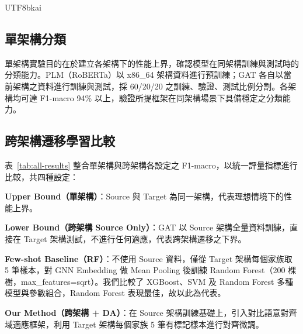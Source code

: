 \documentclass[10pt, a4paper, twocolumn]{article}
\begin{document}
\begin{CJK*}{UTF8}{bkai}
\subsection{單架構分類}

單架構實驗目的在於建立各架構下的性能上界，確認模型在同架構訓練與測試時的分類能力。PLM（RoBERTa）以 x86\_64 架構資料進行預訓練；GAT 各自以當前架構之資料進行訓練與測試，採 60/20/20 之訓練、驗證、測試比例分割。各架構均可達 F1-macro 94\% 以上，驗證所提框架在同架構場景下具備穩定之分類能力。

\subsection{跨架構遷移學習比較}

表~\ref{tab:all-results} 整合單架構與跨架構各設定之 F1-macro，以統一評量指標進行比較，共四種設定：

\textbf{Upper Bound（單架構）}：Source 與 Target 為同一架構，代表理想情境下的性能上界。

\textbf{Lower Bound（跨架構 Source Only）}：GAT 以 Source 架構全量資料訓練，直接在 Target 架構測試，不進行任何適應，代表跨架構遷移之下界。

\textbf{Few-shot Baseline（RF）}：不使用 Source 資料，僅從 Target 架構每個家族取 5 筆樣本，對 GNN Embedding 做 Mean Pooling 後訓練 Random Forest（200 棵樹，\allowbreak max\_features=sqrt）。我們比較了 XGBoost、SVM 及 Random Forest 多種模型與參數組合，Random Forest 表現最佳，故以此為代表。

\textbf{Our Method（跨架構 + DA）}：在 Source 架構訓練基礎上，引入對比語意對齊域適應框架，利用 Target 架構每個家族 5 筆有標記樣本進行對齊微調。


\end{CJK*}
\end{document}
